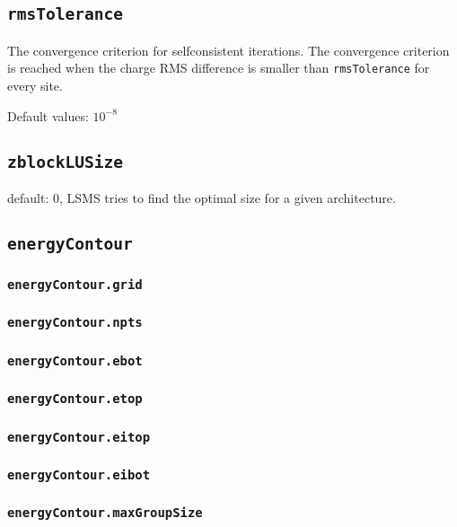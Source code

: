 \subsection{\texttt{rmsTolerance}}
The convergence criterion for selfconsistent iterations. The convergence criterion is reached when
the charge RMS difference is smaller than \texttt{rmsTolerance} for every site.

Default values: $10^{-8}$

\subsection{\texttt{zblockLUSize}}
default: 0, LSMS tries to find the optimal size for a given architecture.

\subsection{\texttt{energyContour}}

\subsubsection{\texttt{energyContour.grid}}

\subsubsection{\texttt{energyContour.npts}}

\subsubsection{\texttt{energyContour.ebot}}

\subsubsection{\texttt{energyContour.etop}}

\subsubsection{\texttt{energyContour.eitop}}

\subsubsection{\texttt{energyContour.eibot}}

\subsubsection{\texttt{energyContour.maxGroupSize}}

